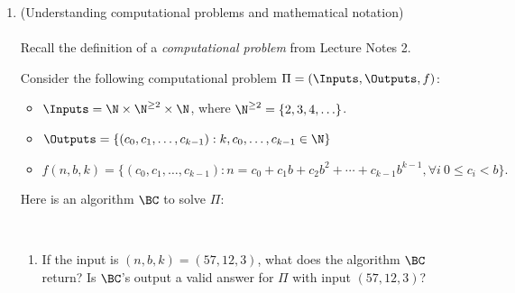 \documentclass[11pt]{article}
\begin{document}
\begin{enumerate}
\begin{enumerate}
\begin{enumerate}
    \item (Optional question\footnote{This question will be graded only if you have seriously attempted all the other questions. It can only be used to increase your grade from an $R$ to an $R^+$.}) Prove that $T^{=}=O(g)$ iff $T=O(g)$. Thus the distinction between $T$ and $T^{=}$ does not matter when we are interested in "big-oh" runtime bounds, which are nondecreasing in most ``natural'' cases.

    (Hint: Recall the formal definition of big-O notation: 
``there exist constants $c > 0$ and $n_0 \in \mathbb{N}$ such that for all 
$n \geq n_0$, \ldots''. In the ``only if" direction, you'll need to find a constant $c$ such that the big-O inequality holds for $T$. Think about how to construct this based on the formal relationship between $T^=$ and $T$.)

    \end{enumerate}

    \end{enumerate}
    
    \newpage
    \item (Understanding computational problems and mathematical notation)\\\\
    Recall the definition of a {\em computational problem} from Lecture Notes 2.  \label{prob:BC}

 
    Consider the following computational problem $\Pi=(\Inputs,\Outputs,f)$: 
    \begin{itemize}                                
    \item $\Inputs = \N\times\N^{\geq 2}\times \N$, where $\N^{\geq 2} = \{2,3,4,\ldots\}$.  
    \item $\Outputs = \{(c_0,c_1,\ldots,c_{k-1}) : k,c_0,\ldots,c_{k-1}\in \N\}$
    \item $f(n,b,k) = \{ (c_0,c_1,\ldots,c_{k-1}) : n=c_0+c_1b+c_2b^2+\cdots+c_{k-1}b^{k-1}, \forall i\ 0\leq c_i< b\}.$ 
    \end{itemize}
Here is an algorithm $\BC$ to solve $\Pi$: 
    
\begin{algorithm}[H]
    \\
    {
    \lElse{\Return{$\bot$}}}
\end{algorithm}


\begin{enumerate}
\item If the input is $(n,b,k) = (57,12,3)$, what does the algorithm $\BC$ return? Is $\BC$'s output a valid answer for $\Pi$ with input $(57,12,3)$?


\end{enumerate}
\end{enumerate}
\end{document}
